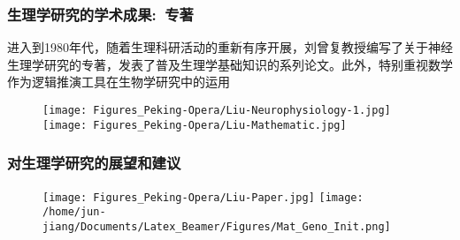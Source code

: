 \frame
{
	\frametitle{生理学研究的学术成果:~专著}
	进入到\textrm{1980}年代，随着生理科研活动的重新有序开展，刘曾复教授编写了关于神经生理学研究的专著，发表了普及生理学基础知识的系列论文。此外，特别重视数学作为逻辑推演工具在生物学研究中的运用
\begin{figure}[h!] 
\centering
\vspace{-0.05in}
\texttt{[image: Figures\_Peking-Opera/Liu-Neurophysiology-1.jpg]}
\texttt{[image: Figures\_Peking-Opera/Liu-Mathematic.jpg]}
\label{Liu-Anatomy_and_Physiology-college}
\end{figure}
}

\frame
{
	\frametitle{对生理学研究的展望和建议}
	{\fontsize{6.2pt}{4.2pt}}
\begin{figure}[h!] 
\centering
\vspace{-0.08in}
\texttt{[image: Figures\_Peking-Opera/Liu-Paper.jpg]}
\texttt{[image: /home/jun-jiang/Documents/Latex\_Beamer/Figures/Mat\_Geno\_Init.png]}
\label{Liu-Paper}
\end{figure}
}

